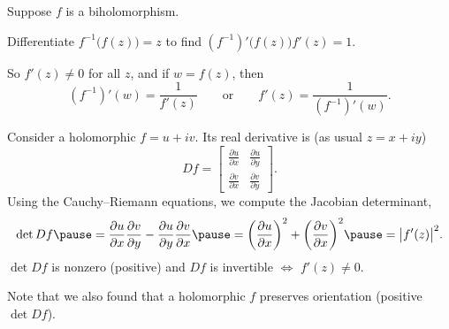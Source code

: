 \documentclass[10pt,aspectratio=169]{beamer}
\begin{document}
\begin{frame}
Suppose $f$ is a biholomorphism.

\pause
\medskip

Differentiate
$f^{-1}\bigl(f(z)\bigr) = z$ to find $(f^{-1})' \bigl(f(z)\bigr) f'(z) = 1$.

\pause
\medskip

So $f'(z) \not= 0$ for all $z$, \pause and
if $w = f(z)$, then
\[
(f^{-1})'(w) = \frac{1}{f'(z)}
\qquad \text{or} \qquad
f'(z) =
\frac{1}{(f^{-1})'(w)} .
\]

\medskip
\pause

Consider a holomorphic 
$f = u+iv$.  \pause Its real derivative is (as usual $z=x+iy$)
\[
Df =
\begin{bmatrix}
\frac{\partial u}{\partial x} & \frac{\partial u}{\partial y} \\[5pt]
\frac{\partial v}{\partial x} & \frac{\partial v}{\partial y}
\end{bmatrix} .
\]
\pause
Using the Cauchy--Riemann equations, we compute the Jacobian determinant,
\[
\det Df \pause
=
\frac{\partial u}{\partial x}
\frac{\partial v}{\partial y} -
\frac{\partial u}{\partial y} 
\frac{\partial v}{\partial x}
\pause
=
{\left(\frac{\partial u}{\partial x}\right)}^2
+
{\left(\frac{\partial v}{\partial x}\right)}^2
\pause
=
\babs{f'(z)}^2 .
\]
\pause
$\det Df$ is nonzero (positive) and $Df$ is invertible $\Leftrightarrow$
$f'(z) \not= 0$.

\medskip
\pause

Note that we also found that a holomorphic $f$ preserves
orientation (positive $\det Df$).
\end{frame}
\end{document}
